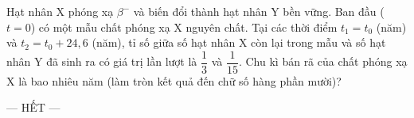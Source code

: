 	\begin{ex}%
		Hạt nhân X phóng xạ $\beta^-$ và biến đổi thành hạt nhân Y bền vững. Ban đầu ($t=0$) có một mẫu chất phóng xạ X nguyên chất. Tại các thời điểm $t_1=t_0$ (năm) và $t_2=t_0+24{,}6$ (năm), tỉ số giữa số hạt nhân X còn lại trong mẫu và số hạt nhân Y đã sinh ra có giá trị lần lượt là $\dfrac{1}{3}$ và $\dfrac{1}{15}$. Chu kì bán rã của chất phóng xạ X là bao nhiêu năm (làm tròn kết quả đến chữ số hàng phần mười)?
		\par
	\end{ex}

	\centerline{--- HẾT ---}


